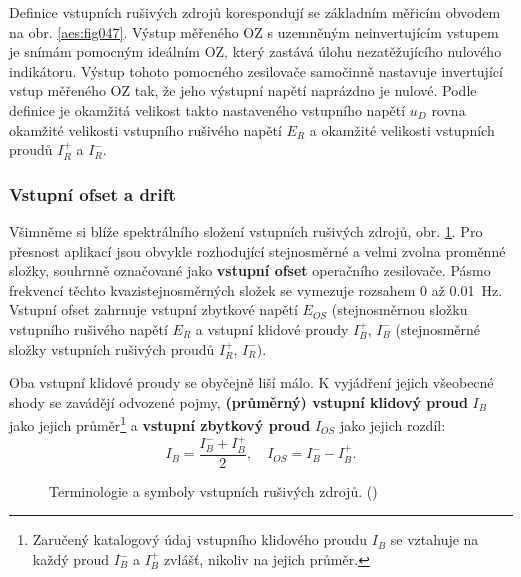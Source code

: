 
        Definice vstupních rušivých zdrojů korespondují se základním měřicím obvodem na obr.
        \ref{aes:fig047}. Výstup měřeného OZ s uzemněným neinvertujícím vstupem je snímám pomocným
        ideálním OZ, který zastává úlohu nezatěžujícího nulového indikátoru. Výstup tohoto pomocného
        zesilovače samočinně nastavuje invertující vstup měřeného OZ tak, že jeho výstupní napětí
        naprázdno je nulové. Podle definice je okamžitá velikost takto nastaveného vstupního napětí
        \(u_D\) rovna okamžité velikosti vstupního rušivého napětí \(E_R\) a okamžité velikosti
        vstupních proudů \(I_R^+\) a \(I_R^-\).

      \subsubsection{Vstupní ofset a drift}\label{aesIchIIIsecIIssecIII}
        Všimněme si blíže spektrálního složení vstupních rušivých zdrojů, obr. \ref{aes:fig048}. Pro
        přesnost aplikací jsou obvykle rozhodující stejnosměrné a velmi zvolna proměnné složky,
        souhrnně označované jako \textbf{vstupní ofset} operačního zesilovače. Pásmo frekvencí
        těchto kvazistejnosměrných složek se vymezuje rozsahem \num{0} až \SI{0.01}{\Hz}. Vstupní
        ofset zahrnuje vstupní zbytkové napětí \(E_{OS}\) (stejnosměrnou složku vstupního rušivého
        napětí \(E_R\) a vstupní klidové proudy \(I_B^+\), \(I_B^-\) (stejnosměrné složky vstupních
        rušivých proudů \(I_R^+\), \(I_R^-\)).
              
        Oba vstupní klidové proudy se obyčejně liší málo. K vyjádření jejich všeobecné shody se
        zavádějí odvozené pojmy, \textbf{(průměrný) vstupní klidový proud} \(I_B\) jako jejich
        průměr\footnote{Zaručený katalogový údaj vstupního klidového proudu \(I_B\) se vztahuje na
        každý proud \(I_B^-\) a \(I_B^+\) zvlášť, nikoliv na jejich průměr.} a \textbf{vstupní
        zbytkový proud} \(I_{OS}\) jako jejich rozdíl:
        \begin{equation}\label{aes:eq090}
          I_B = \dfrac{I_B^- + I_B^+}{2}, \quad I_{OS} = I_B^- - I_B^+.
        \end{equation}
        
        \begin{figure}[ht!] %
          \centering
          \caption{Terminologie a symboly vstupních rušivých zdrojů. (\cite[s.~16]{Dostal})}
          \label{aes:fig048}
        \end{figure}

